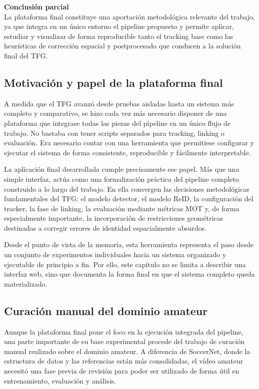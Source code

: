 \documentclass[../MAIN.tex]{subfiles}
\begin{document}
\begin{chaptertemplatebox}
		\textbf{Conclusión parcial}\\
		La plataforma final constituye una aportación metodológica relevante del trabajo, ya que integra en un único entorno el pipeline propuesto y permite aplicar, estudiar y visualizar de forma reproducible tanto el tracking base como las heurísticas de corrección espacial y postprocesado que conducen a la solución final del TFG.
	\end{chaptertemplatebox}
	
	\subsection{Motivación y papel de la plataforma final}
	
	A medida que el TFG avanzó desde pruebas aisladas hasta un sistema más completo y comparativo, se hizo cada vez más necesario disponer de una plataforma que integrase todas las piezas del pipeline en un único flujo de trabajo. No bastaba con tener scripts separados para tracking, linking o evaluación. Era necesario contar con una herramienta que permitiese configurar y ejecutar el sistema de forma consistente, reproducible y fácilmente interpretable.
	
	La aplicación final desarrollada cumple precisamente ese papel. Más que una simple interfaz, actúa como una formalización práctica del pipeline completo construido a lo largo del trabajo. En ella convergen las decisiones metodológicas fundamentales del TFG: el modelo detector, el modelo ReID, la configuración del tracker, la fase de linking, la evaluación mediante métricas MOT y, de forma especialmente importante, la incorporación de restricciones geométricas destinadas a corregir errores de identidad espacialmente absurdos.
	
	Desde el punto de vista de la memoria, esta herramienta representa el paso desde un conjunto de experimentos individuales hacia un sistema organizado y ejecutable de principio a fin. Por ello, este capítulo no se limita a describir una interfaz web, sino que documenta la forma final en que el sistema completo queda materializado.
	
	\subsection{Curación manual del dominio amateur}
	
	Aunque la plataforma final pone el foco en la ejecución integrada del pipeline, una parte importante de su base experimental procede del trabajo de curación manual realizado sobre el dominio amateur. A diferencia de SoccerNet, donde la estructura de datos y las referencias están más consolidadas, el vídeo amateur necesitó una fase previa de revisión para poder ser utilizado de forma útil en entrenamiento, evaluación y análisis.
	
\end{document}

